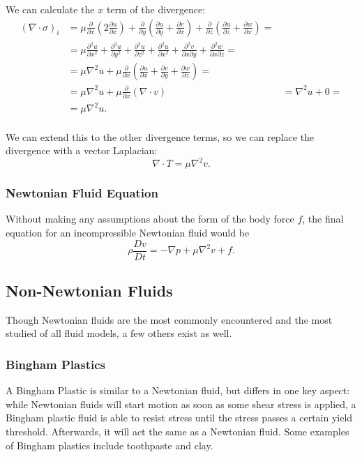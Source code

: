\documentclass[a4paper]{article}
\begin{document}
We can calculate the $x$ term of the divergence:
\begin{align*}
(\nabla\cdot\sigma)_i &= \mu\frac{\partial}{\partial x}(2\frac{\partial u}{\partial x}) + \frac{\partial}{\partial y}(\frac{\partial u}{\partial y}+\frac{\partial v}{\partial x}) + \frac{\partial}{\partial z}(\frac{\partial u}{\partial z}+\frac{\partial w}{\partial x}) = \\
&= \mu\frac{\partial^2 u}{\partial x^2} + \frac{\partial^2 u}{\partial y^2} + \frac{\partial^2 u}{\partial z^2} + \frac{\partial^2 u}{\partial x^2} + \frac{\partial^2 v}{\partial x \partial y} + \frac{\partial^2 w}{\partial x \partial z} = \\
&= \mu\nabla^2 u + \mu\frac{\partial}{\partial x}(\frac{\partial u}{\partial x} + \frac{\partial v}{\partial y} + \frac{\partial w}{\partial z}) = \\
&= \mu\nabla^2 u + \mu\frac{\partial}{\partial x}(\nabla\cdot v) 
&= \nabla^2 u + 0 = \\
&= \mu\nabla^2 u.\\
\end{align*}

We can extend this to the other divergence terms, so we can replace the divergence with a vector Laplacian:
\[\nabla\cdot T = \mu \nabla^2 v.\]

\subsubsection{Newtonian Fluid Equation}
Without making any assumptions about the form of the body force $f$, the final equation for an incompressible Newtonian fluid would be
\[\rho\frac{Dv}{Dt} = -\nabla p + \mu \nabla^2 v + f.\]

\subsection{Non-Newtonian Fluids}

Though Newtonian fluids are the most commonly encountered and the most studied of all fluid models, a few others exist as well. 

\subsubsection{Bingham Plastics}
A Bingham Plastic is similar to a Newtonian fluid, but differs in one key aspect: while Newtonian fluids will start motion as soon as some shear stress is applied, a Bingham plastic fluid is able to resist stress until the stress passes a certain yield threshold. Afterwards, it will act the same as a Newtonian fluid. Some examples of Bingham plastics include toothpaste and clay. 
\end{document}
